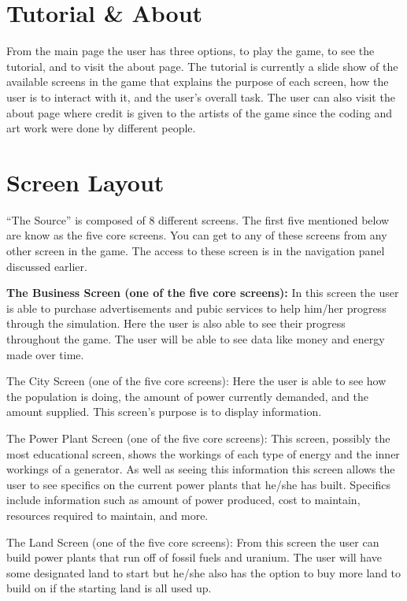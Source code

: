 \documentclass[msc,oneside]{ubcthesis}%
\begin{document}
\section{Tutorial \& About}
    From the main page the user has three options, to play the game, to see the tutorial, and to visit the about page. The tutorial is currently a slide show of the available screens in the game that explains the purpose of each screen, how the user is to interact with it, and the user's overall task. The user can also visit the about page where credit is given to the artists of the game since the coding and art work were done by different people. 

\section{Screen Layout}
``The Source'' is composed of 8 different screens. The first five mentioned below are know as the five core screens. You can get to any of these screens from any other screen in the game. The access to these screen is in the navigation panel discussed earlier.
\bigskip

\noindent \large \textbf{ The Business Screen (one of the five core screens):} \newline
\indent In this screen the user is able to purchase advertisements and pubic services to help him/her 
progress through the simulation. Here the user is also able to see their progress throughout the game. The 
user will be able to see data like money and energy made over time.  
\bigskip

\noindent The City Screen (one of the five core screens): \newline
\indent Here the user is able to see how the population is doing, the amount of power currently demanded, and the amount supplied. This screen's purpose is to display information.
\bigskip

\noindent The Power Plant Screen (one of the five core screens): \newline
\indent This screen, possibly the most educational screen, shows the workings of each type of energy and the inner workings of a generator. As well as seeing this information this screen allows the user to 
see specifics on the current power plants that he/she has built. Specifics include information such as 
amount of power produced, cost to maintain, resources required to maintain, and more. 
\bigskip

\noindent The Land Screen (one of the five core screens): \newline
\indent From this screen the user can build power plants that run off of fossil fuels and uranium. The user will have some designated land to start but he/she also has the option to buy more land to build 
on if the starting land is all used up.
\bigskip
\end{document}
